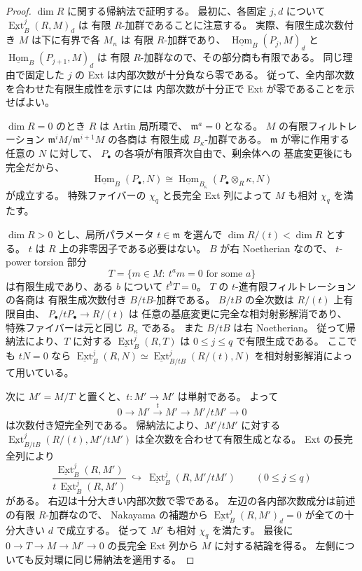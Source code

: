 \begin{proof}
$\dim R$ に関する帰納法で証明する。
最初に、各固定 $j,d$ について
$\underline{\operatorname{Ext}}_B^j(R,M)_d$ は
有限 $R$-加群であることに注意する。
実際、有限生成次数付き $M$ は下に有界で各 $M_n$ は
有限 $R$-加群であり、
$\underline{\operatorname{Hom}}_B(P_j,M)_d$ と
$\underline{\operatorname{Hom}}_B(P_{j+1},M)_d$ は
有限 $R$-加群なので、その部分商も有限である。
同じ理由で固定した $j$ の Ext は内部次数が十分負なら零である。
従って、全内部次数を合わせた有限生成性を示すには
内部次数が十分正で Ext が零であることを示せばよい。

$\dim R=0$ のとき $R$ は Artin 局所環で、
$\mathfrak m^a=0$ となる。
$M$ の有限フィルトレーション
$\mathfrak m^iM/\mathfrak m^{i+1}M$ の各商は
有限生成 $B_\kappa$-加群である。
$\mathfrak m$ が零に作用する任意の $N$ に対して、
$P_\bullet$ の各項が有限斉次自由で、剰余体への
基底変更後にも完全だから、
\[
 \underline{\operatorname{Hom}}_B(P_\bullet,N)
 \cong
 \underline{\operatorname{Hom}}_{B_\kappa}
       (P_\bullet\otimes_R\kappa,N)
\]
が成立する。
特殊ファイバーの $\chi_q$ と長完全 Ext 列によって
$M$ も相対 $\chi_q$ を満たす。

$\dim R>0$ とし、局所パラメータ
$t\in\mathfrak m$ を選んで
$\dim R/(t)<\dim R$ とする。
$t$ は $R$ 上の非零因子である必要はない。
$B$ が右 Noetherian なので、
$t$-power torsion 部分
\[
 T=\{m\in M:\ t^a m=0\text{ for some }a\}
\]
は有限生成であり、ある $b$ について $t^bT=0$。
$T$ の $t$-進有限フィルトレーションの各商は
有限生成次数付き $B/tB$-加群である。
$B/tB$ の全次数は $R/(t)$ 上有限自由、
$P_\bullet/tP_\bullet\to R/(t)$ は
任意の基底変更に完全な相対射影解消であり、
特殊ファイバーは元と同じ $B_\kappa$ である。
また $B/tB$ は右 Noetherian。
従って帰納法により、$T$ に対する
$\underline{\operatorname{Ext}}_B^j(R,T)$
は $0\le j\le q$ で有限生成である。
ここでも $tN=0$ なら
$\underline{\operatorname{Ext}}_B^j(R,N)
\simeq\underline{\operatorname{Ext}}_{B/tB}^j(R/(t),N)$
を相対射影解消によって用いている。

次に $M'=M/T$ と置くと、$t:M'\to M'$ は単射である。
よって
\[
 0\longrightarrow M'\xrightarrow{\,t\,}M'
  \longrightarrow M'/tM'\longrightarrow0
\]
は次数付き短完全列である。
帰納法により、$M'/tM'$ に対する
$\underline{\operatorname{Ext}}_{B/tB}^j(R/(t),M'/tM')$
は全次数を合わせて有限生成となる。
Ext の長完全列により
\[
 \frac{\underline{\operatorname{Ext}}_B^j(R,M')}
      {t\,\underline{\operatorname{Ext}}_B^j(R,M')}
 \ \hookrightarrow\
 \underline{\operatorname{Ext}}_B^j(R,M'/tM')
 \qquad(0\le j\le q)
\]
がある。
右辺は十分大きい内部次数で零である。
左辺の各内部次数成分は前述の有限 $R$-加群なので、
Nakayama の補題から
$\underline{\operatorname{Ext}}_B^j(R,M')_d=0$
が全ての十分大きい $d$ で成立する。
従って $M'$ も相対 $\chi_q$ を満たす。
最後に $0\to T\to M\to M'\to0$ の長完全 Ext 列から
$M$ に対する結論を得る。
左側についても反対環に同じ帰納法を適用する。
\end{proof}



